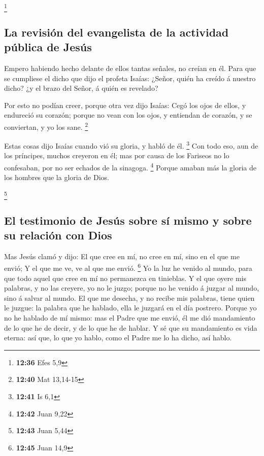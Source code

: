 \footnote{\textbf{12:36} Efes 5,9}

\hypertarget{la-revisiuxf3n-del-evangelista-de-la-actividad-puxfablica-de-jesuxfas}{%
\subsection{La revisión del evangelista de la actividad pública de
Jesús}\label{la-revisiuxf3n-del-evangelista-de-la-actividad-puxfablica-de-jesuxfas}}

 Empero habiendo hecho delante de ellos tantas señales, no
creían en él.  Para que se cumpliese el dicho que dijo el
profeta Isaías: ¿Señor, quién ha creído á nuestro dicho? ¿y el brazo del
Señor, á quién es revelado?

 Por esto no podían creer, porque otra vez dijo Isaías:
 Cegó los ojos de ellos, y endureció su corazón; porque no
vean con los ojos, y entiendan de corazón, y se conviertan, y yo los
sane. \footnote{\textbf{12:40} Mat 13,14-15}

 Estas cosas dijo Isaías cuando vió su gloria, y habló de
él. \footnote{\textbf{12:41} Is 6,1}  Con todo eso, aun de
los príncipes, muchos creyeron en él; mas por causa de los Fariseos no
lo confesaban, por no ser echados de la sinagoga. \footnote{\textbf{12:42}
  Juan 9,22}  Porque amaban más la gloria de los hombres
que la gloria de Dios.

\footnote{\textbf{12:43} Juan 5,44}

\hypertarget{el-testimonio-de-jesuxfas-sobre-suxed-mismo-y-sobre-su-relaciuxf3n-con-dios}{%
\subsection{El testimonio de Jesús sobre sí mismo y sobre su relación
con
Dios}\label{el-testimonio-de-jesuxfas-sobre-suxed-mismo-y-sobre-su-relaciuxf3n-con-dios}}

 Mas Jesús clamó y dijo: El que cree en mí, no cree en mí,
sino en el que me envió;  Y el que me ve, ve al que me
envió. \footnote{\textbf{12:45} Juan 14,9}  Yo la luz he
venido al mundo, para que todo aquel que cree en mí no permanezca en
tinieblas.  Y el que oyere mis palabras, y no las creyere,
yo no le juzgo; porque no he venido á juzgar al mundo, sino á salvar al
mundo.  El que me desecha, y no recibe mis palabras, tiene
quien le juzgue: la palabra que he hablado, ella le juzgará en el día
postrero.  Porque yo no he hablado de mí mismo: mas el
Padre que me envió, él me dió mandamiento de lo que he de decir, y de lo
que he de hablar.  Y sé que su mandamiento es vida eterna:
así que, lo que yo hablo, como el Padre me lo ha dicho, así hablo.


